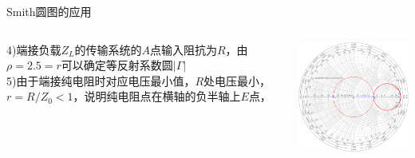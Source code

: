 \begin{frame}{Smith圆图的应用}
  \begin{columns}
    \begin{column}{0.4\linewidth}
      4)\quad 端接负载$Z_L$的传输系统的$A$点输入阻抗为$R$，由$\rho=2.5=r$可以确定等反射系数圆$\lvert\Gamma\rvert$\\
      5)\quad 由于端接纯电阻时对应电压最小值，$R$处电压最小，$r=R/Z_0<1$，说明纯电阻点在横轴的负半轴上$E$点，
    \end{column}
    \begin{column}{0.6\linewidth}
      \includegraphics[width=7cm]{Cha4//fig4-17-6.pdf}
    \end{column}
  \end{columns}
\end{frame}

